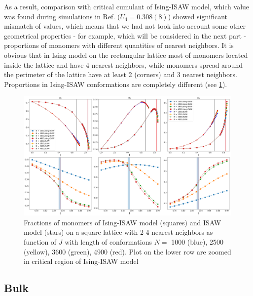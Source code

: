 \documentclass[aps,pre,amssymb,amsmath,twocolumn,floatfix]{revtex4-2}
\begin{document}
As a result, comparison with critical cumulant of Ising-ISAW model, which value was found during simulations in Ref.\cite{faizullina2021critical} ($U_{4} = 0.308(8)$) showed significant mismatch of values, which means that we had not took into account some other geometrical properties - for example, which will be considered in the next part - proportions of monomers with different quantities of nearest neighbors. It is obvious that in Ising model on the rectangular lattice most of monomers located inside the lattice and have 4 nearest neighbors, while monomers spread around the perimeter of the lattice have at least 2 (corners) and 3 nearest neighbors. Proportions in Ising-ISAW conformations are completely different (see \cref{fig:Ising_vs_ISAW2D}).

\begin{figure}
    \centering
    \includegraphics[width=0.99\textwidth]{Images/bulk2-4.png}
    \caption{Fractions of monomers of Ising-ISAW model (squares) and ISAW model (stars) on a square lattice with 2-4 nearest neighbors as function of $J$ with length of conformations $N = $ 1000 (blue), 2500 (yellow), 3600 (green), 4900 (red). Plot on the lower row are zoomed in critical region of Ising-ISAW model}
    \label{fig:Ising_vs_ISAW2D}
\end{figure}

\subsection{Bulk}
\end{document}
